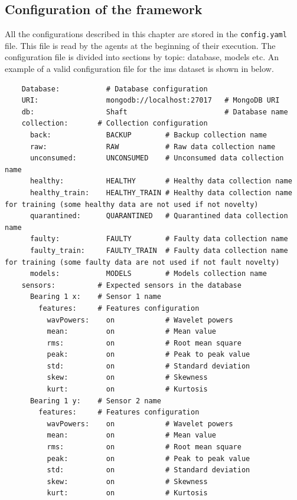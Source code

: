 \subsection{Configuration of the framework}
All the configurations described in this chapter are stored in the \texttt{config.yaml} file. This file is read by the agents at the beginning of their execution. The configuration file is divided into sections by topic: database, models etc. An example of a valid configuration file for the \gls{ims} dataset is shown in below.
\begin{verbatim}
    Database:           # Database configuration
    URI:                mongodb://localhost:27017   # MongoDB URI
    db:                 Shaft                       # Database name
    collection:       # Collection configuration
      back:             BACKUP        # Backup collection name
      raw:              RAW           # Raw data collection name
      unconsumed:       UNCONSUMED    # Unconsumed data collection name
      healthy:          HEALTHY       # Healthy data collection name
      healthy_train:    HEALTHY_TRAIN # Healthy data collection name for training (some healthy data are not used if not novelty)
      quarantined:      QUARANTINED   # Quarantined data collection name
      faulty:           FAULTY        # Faulty data collection name
      faulty_train:     FAULTY_TRAIN  # Faulty data collection name for training (some faulty data are not used if not fault novelty)
      models:           MODELS        # Models collection name
    sensors:          # Expected sensors in the database
      Bearing 1 x:    # Sensor 1 name
        features:     # Features configuration
          wavPowers:    on            # Wavelet powers
          mean:         on            # Mean value
          rms:          on            # Root mean square
          peak:         on            # Peak to peak value
          std:          on            # Standard deviation
          skew:         on            # Skewness
          kurt:         on            # Kurtosis
      Bearing 1 y:    # Sensor 2 name
        features:     # Features configuration
          wavPowers:    on            # Wavelet powers
          mean:         on            # Mean value
          rms:          on            # Root mean square
          peak:         on            # Peak to peak value
          std:          on            # Standard deviation
          skew:         on            # Skewness
          kurt:         on            # Kurtosis

\end{verbatim}
